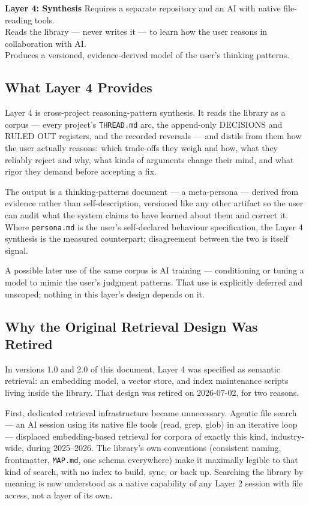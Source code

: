 \documentclass[12pt,letterpaper]{article}
\begin{document}
\begin{layerbox4}
\textbf{Layer 4: Synthesis} \quad Requires a separate repository and an AI with native file-reading tools.\\
Reads the library --- never writes it --- to learn how the user reasons in collaboration with AI.\\
Produces a versioned, evidence-derived model of the user's thinking patterns.
\end{layerbox4}

\subsection{What Layer 4 Provides}

Layer 4 is cross-project reasoning-pattern synthesis. It reads the
library as a corpus --- every project's \texttt{THREAD.md} arc, the
append-only DECISIONS and RULED OUT registers, and the recorded
reversals --- and distils from them how the user actually reasons:
which trade-offs they weigh and how, what they reliably reject and
why, what kinds of arguments change their mind, and what rigor they
demand before accepting a fix.

The output is a thinking-patterns document --- a meta-persona ---
derived from evidence rather than self-description, versioned like any
other artifact so the user can audit what the system claims to have
learned about them and correct it. Where \texttt{persona.md} is the
user's self-declared behaviour specification, the Layer 4 synthesis is
the measured counterpart; disagreement between the two is itself
signal.

A possible later use of the same corpus is AI training ---
conditioning or tuning a model to mimic the user's judgment patterns.
That use is explicitly deferred and unscoped; nothing in this layer's
design depends on it.

\subsection{Why the Original Retrieval Design Was Retired}

In versions 1.0 and 2.0 of this document, Layer 4 was specified as
semantic retrieval: an embedding model, a vector store, and index
maintenance scripts living inside the library. That design was retired
on 2026-07-02, for two reasons.

First, dedicated retrieval infrastructure became unnecessary. Agentic
file search --- an AI session using its native file tools (read, grep,
glob) in an iterative loop --- displaced embedding-based retrieval for
corpora of exactly this kind, industry-wide, during 2025--2026. The
library's own conventions (consistent naming, frontmatter,
\texttt{MAP.md}, one schema everywhere) make it maximally legible to
that kind of search, with no index to build, sync, or back up.
Searching the library by meaning is now understood as a native
capability of any Layer 2 session with file access, not a layer of its
own.
\end{document}

